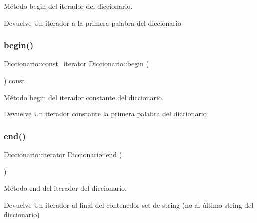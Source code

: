 Método begin del iterador del diccionario. 

\begin{DoxyReturn}{Devuelve}
Un iterador a la primera palabra del diccionario 
\end{DoxyReturn}
\mbox{\label{classDiccionario_a5196245f1d267b0ddb9350dfa8f33b2c}} 
\subsubsection{\texorpdfstring{begin()}{begin()}\hspace{0.1cm}{\footnotesize\ttfamily [2/2]}}
{\footnotesize\ttfamily \hyperlink{classDiccionario_acc32ba2eaee59fdd4836d9a28f04afd0}{Diccionario\+::const\+\_\+iterator} Diccionario\+::begin (\begin{DoxyParamCaption}{ }\end{DoxyParamCaption}) const}



Método begin del iterador constante del diccionario. 

\begin{DoxyReturn}{Devuelve}
Un iterador constante la primera palabra del diccionario 
\end{DoxyReturn}
\mbox{\label{classDiccionario_a7de585de002dfdec241b645bc57a3d0a}} 
\subsubsection{\texorpdfstring{end()}{end()}\hspace{0.1cm}{\footnotesize\ttfamily [1/2]}}
{\footnotesize\ttfamily \hyperlink{classDiccionario_a51a063699a325e85d6c2640e9c4b42cf}{Diccionario\+::iterator} Diccionario\+::end (\begin{DoxyParamCaption}{ }\end{DoxyParamCaption})}



Método end del iterador del diccionario. 

\begin{DoxyReturn}{Devuelve}
Un iterador al final del contenedor set de string (no al último string del diccionario) 
\end{DoxyReturn}
\mbox{\label{classDiccionario_a8161ae4e92a33e516bf73741e8299846}} 
